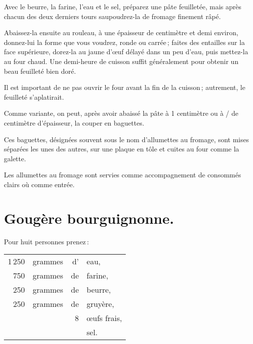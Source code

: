 Avec le beurre, la farine, l'eau et le sel, préparez une pâte feuilletée, mais après
chacun des deux derniers tours saupoudrez-la de fromage finement râpé.

Abaissez-la ensuite au rouleau, à une épaisseur de {\mmm} centimètre et
demi environ, donnez-lui la forme que vous voudrez, ronde ou carrée ; faites
des entailles sur la face supérieure, dorez-la au jaune d'œuf délayé dans un
peu d'eau, puis mettez-la au four chaud. Une demi-heure de cuisson suffit
généralement pour obtenir un beau feuilleté bien doré.

Il est important de ne pas ouvrir le four avant la fin de la cuisson ;
autrement, le feuilleté s'aplatirait.

\sk

Comme variante, on peut, après avoir abaissé la pâte à 1 centimètre ou
à {\mmm}/{\mmm} de centimètre d'épaisseur, la couper en baguettes.

Ces baguettes, désignées souvent sous le nom d'allumettes au fromage, sont
mises séparées les unes des autres, sur une plaque en tôle et cuites au four
comme la galette.

\medskip

Les allumettes au fromage sont servies comme accompagnement de consommés
clairs où comme entrée.

\section*{\centering Gougère bourguignonne.}
{}

Pour huit personnes prenez :

\footnotesize
\begin{longtable}{rrrp{16em}}
  1 250 & grammes & d' & eau,                                                                             \\
    750 & grammes & de & farine,                                                                          \\
    250 & grammes & de & beurre,                                                                          \\
    250 & grammes & de & gruyère,                                                                         \\
        &         &  8 & œufs frais,                                                                      \\
        &         &    & sel.                                                                             \\
\end{longtable}
\normalsize

